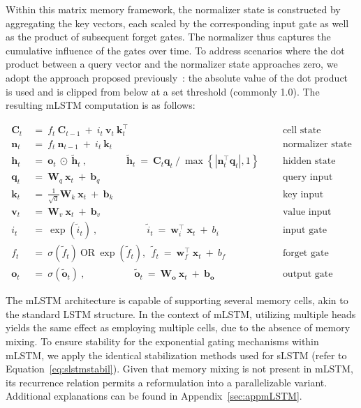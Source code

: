 Within this matrix memory framework, the normalizer state is constructed by aggregating the key vectors, each scaled by the corresponding input gate as well as the product of subsequent forget gates. The normalizer thus captures the cumulative influence of the gates over time. To address scenarios where the dot product between a query vector and the normalizer state approaches zero, we adopt the approach proposed previously~\citep{Sun:23arxiv}: the absolute value of the dot product is used and is clipped from below at a set threshold (commonly 1.0). The resulting mLSTM computation is as follows:

\begin{align}
\label{eq:mlstm_recurrent_begin}
\mathbf{C}_t \ &= \ f_t \ \mathbf{C}_{t-1} \ + \ 
  i_t \ \mathbf{v}_t \ \mathbf{k}_t^\top & & &\text{cell state} \\
\mathbf{n}_t \ &= \ f_t \ \mathbf{n}_{t-1} \ + \ 
  i_t \ \mathbf{k}_t & & &\text{normalizer state} \\
\mathbf{h}_t \ &= \ \mathbf{o}_t \ \odot \ \tilde{\mathbf{h}}_t
\ , \qquad \qquad 
\tilde{\mathbf{h}}_t \ = \  \mathbf{C}_t \mathbf{q}_t \ / \ 
  \max \left\{ |\mathbf{n}_t^\top \mathbf{q}_t|, 1 \right\}
   &&&\text{hidden state} \\
\mathbf{q}_t \ &= \ \mathbf{W}_q \ \mathbf{x}_t \ + \ \mathbf{b}_q & & &\text{query input} \\
\mathbf{k}_t \ &= \ \frac{1}{\sqrt{d}} \mathbf{W}_k \ \mathbf{x}_t \ + \ \mathbf{b}_k & & &\text{key input} \\
\mathbf{v}_t \ &= \ \mathbf{W}_v \ \mathbf{x}_t \ + \ \mathbf{b}_v & & &\text{value input} \\
i_t \ &= \ \exp \left( \tilde{i}_t \right) \ , 
 \qquad \qquad \quad
  \tilde{i}_t \ = \ \mathbf{w}^\top_{i} \ \mathbf{x}_t \ + \  b_{i} 
  &&&\text{input gate} \\
f_t \ &= \ \sigma \! \left( \tilde{f}_t \right) \ \text{OR} \ \exp \! \left( \tilde{f}_t \right) , \ \
\tilde{f}_t \ = \ \mathbf{w}^\top_{f} \ \mathbf{x}_t  \ + \
  b_{f}
  &&&\text{forget gate} \\
\label{eq:mlstm_recurrent_end}
\mathbf{o}_t \ &= \ \sigma \left( \tilde{\mathbf{o}}_t \right) \ , \qquad \qquad \quad
  \tilde{\mathbf{o}}_t  \ = \ \mathbf{W}_{\mathbf{o}} \ \mathbf{x}_t \ + \
  \mathbf{b}_{\mathbf{o}}
  &&&\text{output gate}
\end{align}

The mLSTM architecture is capable of supporting several memory cells, akin to the standard LSTM structure. In the context of mLSTM, utilizing multiple heads yields the same effect as employing multiple cells, due to the absence of memory mixing. To ensure stability for the exponential gating mechanisms within mLSTM, we apply the identical stabilization methods used for sLSTM (refer to Equation~\ref{eq:slstmstabil}). Given that memory mixing is not present in mLSTM, its recurrence relation permits a reformulation into a parallelizable variant. Additional explanations can be found in Appendix~\ref{sec:appmLSTM}.

